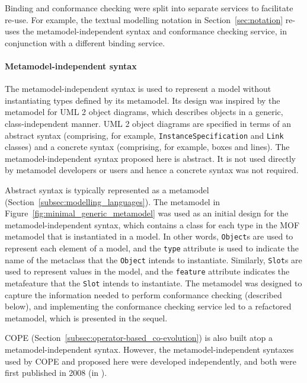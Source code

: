 Binding and conformance checking were split into separate services to facilitate re-use. For example, the textual modelling notation in Section~\ref{sec:notation} re-uses the metamodel-independent syntax and conformance checking service, in conjunction with a different binding service.

\paragraph{Metamodel-independent syntax} The metamodel-independent syntax is used to represent a model without instantiating types defined by its metamodel. Its design was inspired by the metamodel for UML 2 \cite{uml212} object diagrams, which describes objects in a generic, class-independent manner. UML 2 object diagrams are specified in terms of an abstract syntax (comprising, for example, \texttt{InstanceSpecification} and \texttt{Link} classes) and a concrete syntax (comprising, for example, boxes and lines). The metamodel-independent syntax proposed here is abstract. It is not used directly by metamodel developers or users and hence a concrete syntax was not required.

Abstract syntax is typically represented as a metamodel (Section~\ref{subsec:modelling_languages}). The metamodel in Figure~\ref{fig:minimal_generic_metamodel} was used as an initial design for the metamodel-independent syntax, which contains a class for each type in the MOF metamodel that is instantiated in a model. In other words, \texttt{Ob\-je\-ct}s are used to represent each element of a model, and the \texttt{ty\-pe} attribute is used to indicate the name of the metaclass that the \texttt{Ob\-je\-ct} intends to instantiate. Similarly, \texttt{Sl\-ot}s are used to represent values in the model, and the \texttt{feature} attribute indicates the metafeature that the \texttt{Sl\-ot} intends to instantiate. The metamodel was designed to capture the information needed to perform conformance checking (described below), and implementing the conformance checking service led to a refactored metamodel, which is presented in the sequel.

COPE (Section~\ref{subsec:operator-based_co-evolution}) is also built atop a metamodel-independent syntax. However, the metamodel-independent syntaxes used by COPE and proposed here were developed independently, and both were first published in 2008 (in \cite{rose08hutn,herrmannsdoerfer08cope}).

